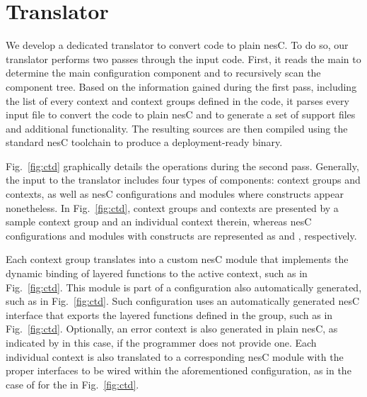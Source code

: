  \section{Translator}\label{sec:translator}

We develop a dedicated translator to convert \conesc code to plain
nesC. To do so, our translator performs two passes through the input
code. First, it reads the main  to determine the main
configuration component and to recursively scan the component
tree. Based on the information gained during the first pass, including
the list of every context and context groups defined in the code, it
parses every input file to convert the \conesc code to plain nesC and
to generate a set of support files and additional functionality. The
resulting sources are then compiled using the standard nesC toolchain
to produce a deployment-ready binary.


Fig.~\ref{fig:ctd} graphically details the operations during the
second pass. Generally, the input to the translator includes four
types of components: context groups and contexts, as well as nesC
configurations and modules where \conesc constructs appear
nonetheless.  In Fig.~\ref{fig:ctd}, context groups and contexts are
presented by a sample  context group and an individual
 context therein, whereas nesC configurations and modules
with \conesc constructs are represented as  and
, respectively.

Each context group translates into a custom nesC module that
implements the dynamic binding of layered functions to the active
context, such as  in Fig.~\ref{fig:ctd}. This
module is part of a configuration also automatically generated, such
as  in Fig.~\ref{fig:ctd}. Such configuration
uses an automatically generated nesC interface that exports the
layered functions defined in the group, such as 
in Fig.~\ref{fig:ctd}. Optionally, an error context is also generated
in plain nesC, as indicated by  in this case, if
the programmer does not provide one. Each individual context is also
translated to a corresponding nesC module with the proper interfaces
to be wired within the aforementioned configuration, as in the case of
 for the  in
Fig.~\ref{fig:ctd}.

